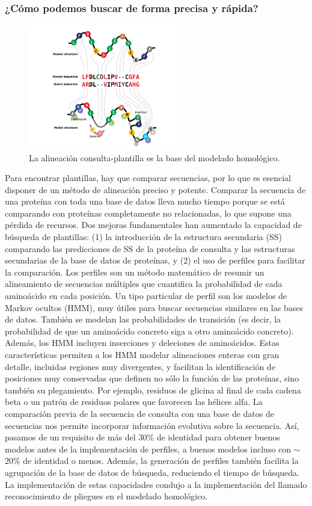\subsubsection{¿Cómo podemos buscar de forma precisa y rápida?}
\begin{figure}[h]
\centering
\includegraphics[width = 0.6\textwidth]{figs/template_query.png}
\caption{La alineación consulta-plantilla es la base del modelado homológico.}
\end{figure}

Para encontrar plantillas, hay que comparar secuencias, por lo que es esencial disponer de un método de alineación preciso y potente. Comparar la secuencia de una proteína con toda una base de datos lleva mucho tiempo porque se está comparando con proteínas completamente no relacionadas, lo que supone una pérdida de recursos. Dos mejoras fundamentales han aumentado la capacidad de búsqueda de plantillas: (1) la introducción de la estructura secundaria (SS) comparando las predicciones de SS de la proteína de consulta y las estructuras secundarias de la base de datos de proteínas, y (2) el uso de perfiles para facilitar la comparación. Los perfiles son un método matemático de resumir un alineamiento de secuencias múltiples que cuantifica la probabilidad de cada aminoácido en cada posición. Un tipo particular de perfil son los modelos de Markov ocultos (HMM), muy útiles para buscar secuencias similares en las bases de datos. También se modelan las probabilidades de transición (es decir, la probabilidad de que un aminoácido concreto siga a otro aminoácido concreto). 
Además, los HMM incluyen inserciones y deleciones de aminoácidos. Estas características permiten a los HMM modelar alineaciones enteras con gran detalle, incluidas regiones muy divergentes, y facilitan la identificación de posiciones muy conservadas que definen no sólo la función de las proteínas, sino también su plegamiento. Por ejemplo, residuos de glicina al final de cada cadena beta o un patrón de residuos polares que favorecen las hélices alfa. La comparación previa de la secuencia de consulta con una base de datos de secuencias nos permite incorporar información evolutiva sobre la secuencia. Así, pasamos de un requisito de más del 30\% de identidad para obtener buenos modelos antes de la implementación de perfiles, a buenos modelos incluso con $\sim$20\% de identidad o menos. Además, la generación de perfiles también facilita la agrupación de la base de datos de búsqueda, reduciendo el tiempo de búsqueda. La implementación de estas capacidades condujo a la implementación del llamado reconocimiento de pliegues en el modelado homológico.

